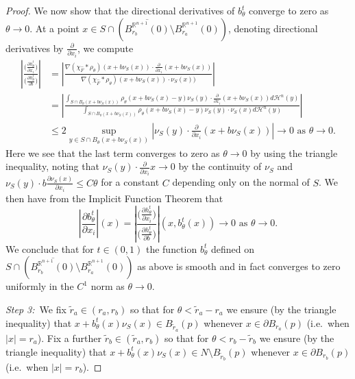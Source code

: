 \documentclass[11pt]{article}
\begin{document}
\begin{proof}
\bigskip

We now show that the directional derivatives of $b^t_\theta$ converge to zero as $\theta \rightarrow 0$. At a point $x \in S \cap (\overline{B_{r_b}^{\mathbb{R}^{n+1}}(0)} \setminus B_{r_a}^{\mathbb{R}^{n+1}}(0))$, denoting directional derivatives by $\frac{\partial}{\partial x_i}$, we compute
\begin{align*}
    \left| 
    \frac{\Big(\frac{\partial h^t_\theta}{\partial x_i}\Big)}{\Big(\frac{\partial h^t_\theta}{\partial b}\Big)} \right| &= \left| \frac{\nabla(\chi_{\widehat{F}} * \rho_\theta)(x+b\nu_S(x)) \cdot \frac{\partial}{\partial x_i}(x + b\nu_S(x))}{\nabla(\chi_{\widehat{F}} * \rho_\theta)(x+b\nu_S(x)) \cdot \nu_S(x))} \right|\\
    &= \left| \frac{\int_{S \cap B_\theta(x + b\nu_S(x))} \rho_\theta (x + b\nu_S(x) - y)\nu_S(y) \cdot \frac{\partial}{\partial x_i}(x + b\nu_S(x)) d\mathcal{H}^n(y)}{\int_{S \cap B_\theta(x + b\nu_S(x))} \rho_\theta (x + b\nu_S(x) - y)\nu_S(y) \cdot \nu_S(x) d\mathcal{H}^n(y)} \right|\\
    &\leq 2 \sup_{y \in S \cap B_\theta(x + b\nu_S(x))} \left|\nu_S(y) \cdot \frac{\partial}{\partial x_i}(x + b\nu_S(x))\right| \rightarrow 0 \text{ as } \theta \rightarrow 0.
\end{align*}
Here we see that the last term converges to zero as $\theta \rightarrow 0$ by using the triangle inequality, noting that $\nu_S(y) \cdot \frac{\partial}{\partial x_i} x \rightarrow 0$ by the continuity of $\nu_S$ and $\nu_S(y) \cdot b
\frac{\partial \nu_S(x)}{\partial x_i} \leq C \theta$ for a constant $C$ depending only on the normal of $S$. We then have from the Implicit Function Theorem that
\begin{equation*}
    \left| \frac{\partial b^t_\theta}{\partial x_i}  \right|(x) =  \left| 
    \frac{\Big(\frac{\partial h^t_\theta}{\partial x_i}\Big)}{\Big(\frac{\partial h^t_\theta}{\partial b}\Big)} \right|(x,b^t_\theta(x)) \rightarrow 0 \text{ as } \theta \rightarrow 0. 
\end{equation*}
We conclude that for $t \in (0,1)$ the function $b_\theta^t$ defined on $S \cap (\overline{B_{r_b}^{\mathbb{R}^{n+1}}(0)} \setminus B_{r_a}^{\mathbb{R}^{n+1}}(0))$ as above is smooth and in fact converges to zero uniformly in the $C^1$ norm as $\theta \rightarrow 0$.

\bigskip

\textit{Step 3:}~We fix $\tilde{r}_a \in (r_a, r_b)$ so that for $\theta < \tilde{r}_a - r_a$ we ensure (by the triangle inequality) that $x + b^t_\theta(x) \nu_S(x) \in B_{\tilde{r}_a}(p)$ whenever $x \in \partial B_{r_a}(p)$ (i.e.~when $|x| = r_a$). Fix a further $\tilde{r}_b \in (\tilde{r}_a,r_b)$ so that for $\theta < r_b - \tilde{r}_b$ we ensure (by the triangle inequality) that $x + b^t_\theta(x) \nu_S(x) \in N \setminus B_{\tilde{r}_b}(p)$ whenever $x \in \partial B_{r_b}(p)$ (i.e.~when $|x| = r_b$).


\end{proof}
\end{document}
